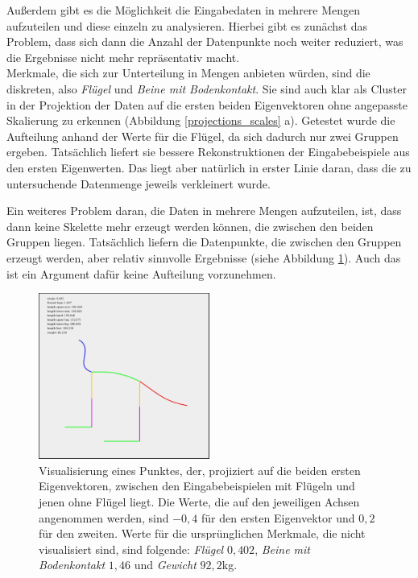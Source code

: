  Außerdem gibt es die Möglichkeit die Eingabedaten in mehrere Mengen aufzuteilen und diese einzeln zu analysieren. Hierbei gibt es zunächst das Problem, dass sich dann die Anzahl der Datenpunkte noch weiter reduziert, was die Ergebnisse nicht mehr repräsentativ macht.\\
 Merkmale, die sich zur Unterteilung in Mengen anbieten würden, sind die diskreten, also \emph{Flügel} und \emph{Beine mit Bodenkontakt}. Sie sind auch klar als Cluster in der Projektion der Daten auf die ersten beiden Eigenvektoren ohne angepasste Skalierung zu erkennen (Abbildung \ref{projections_scales} a).
 Getestet wurde die Aufteilung anhand der Werte für die Flügel, da sich dadurch nur zwei Gruppen ergeben. Tatsächlich liefert sie bessere Rekonstruktionen der Eingabebeispiele aus den ersten Eigenwerten. Das liegt aber natürlich in erster Linie daran, dass die zu untersuchende Datenmenge jeweils verkleinert wurde.
 
 Ein weiteres Problem daran, die Daten in mehrere Mengen aufzuteilen, ist, dass dann keine Skelette mehr erzeugt werden können, die zwischen den beiden Gruppen liegen. Tatsächlich liefern die Datenpunkte, die zwischen den Gruppen erzeugt werden, aber relativ sinnvolle Ergebnisse  (siehe Abbildung \ref{between_clusters}).
 Auch das ist ein Argument dafür keine Aufteilung vorzunehmen.
 
 \begin{figure}
  \centering
  \includegraphics[width=0.5\textwidth]{graphics/betweenClusters.jpg}
  \caption{Visualisierung eines Punktes, der, projiziert auf die beiden ersten Eigenvektoren, zwischen den Eingabebeispielen mit Flügeln und jenen ohne Flügel liegt. Die Werte, die auf den jeweiligen Achsen angenommen werden, sind $-0{,}4$ für den ersten Eigenvektor und $0{,}2$ für den zweiten. Werte für die ursprünglichen Merkmale, die nicht visualisiert sind, sind folgende: \emph{Flügel} $0{,}402$, \emph{Beine mit Bodenkontakt} $1{,}46$ und \emph{Gewicht} $92{,}2$kg.}
  \label{between_clusters}
 \end{figure}


